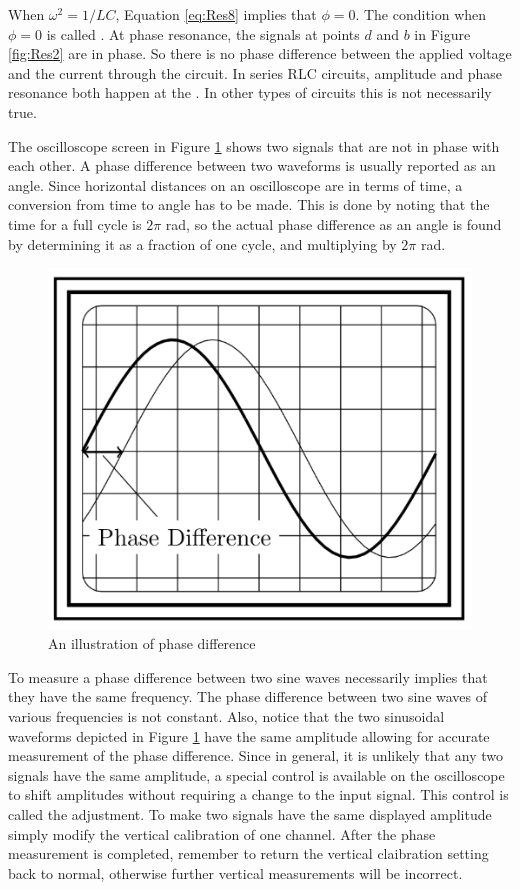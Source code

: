 \documentclass[12pt, a4paper, oneside, openright, titlepage]{book}
\begin{document}
\noindent When $\omega^2 = 1/LC$, Equation \ref{eq:Res8} implies that $\phi = 0$. The condition when $\phi = 0$ is called . At phase resonance, the signals at points $d$ and $b$ in Figure \ref{fig:Res2} are in phase. So there is no phase difference between the applied voltage and the current through the circuit. In series RLC circuits, amplitude and phase resonance both happen at the . In other types of circuits this is not necessarily true.

\noindent The oscilloscope screen in Figure \ref{fig:Res3} shows two signals that are not in phase with each other. A phase difference between two waveforms is usually reported as an angle. Since horizontal distances on an oscilloscope are in terms of time, a conversion from time to angle has to be made. This is done by noting that the time for a full cycle is $2\pi$ rad, so the actual phase difference as an angle is found by determining it as a fraction of one cycle, and multiplying by $2\pi$ rad.

\begin{figure}[H]
    \centering
    \includegraphics[scale = 0.8]{Images/Res3.PNG}
    \caption{An illustration of phase difference}
    \label{fig:Res3}
\end{figure}

To measure a phase difference between two sine waves necessarily implies that they have the same frequency. The phase difference between two sine waves of various frequencies is not constant. Also, notice that the two sinusoidal waveforms depicted in Figure \ref{fig:Res3} have the same amplitude allowing for accurate measurement of the phase difference. Since in general, it is unlikely that any two signals have the same amplitude, a special control is available on the oscilloscope to shift amplitudes without requiring a change to the input signal. This control is called the  adjustment. To make two signals have the same displayed amplitude simply modify the vertical calibration of one channel. After the phase measurement is completed, remember to return the vertical claibration setting back to normal, otherwise further vertical measurements will be incorrect.
\end{document}
